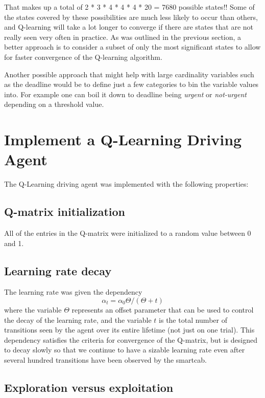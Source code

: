 \documentclass[conference]{IEEEtran}
\begin{document}
That makes up a total of 2 * 3 * 4 * 4 * 4 * 20 = 7680 possible states!!  Some
of the states covered by these possibilities are much less likely to occur than
others, and Q-learning will take a lot longer to converge if there are states
that are not really seen very often in practice.  As was outlined in the
previous section, a better approach is to consider a subset of only the most
significant states to allow for faster convergence of the Q-learning algorithm.

Another possible approach that might help with large cardinality variables such
as the deadline would be to define just a few categories to bin the variable
values into.  For example one can boil it down to deadline being
\textit{urgent} or \textit{not-urgent} depending on a threshold value. 

\section{Implement a Q-Learning Driving Agent}

The Q-Learning driving agent was implemented with the following properties:

\subsection{Q-matrix initialization}

All of the entries in the Q-matrix were initialized to a random value between
0 and 1. 

\subsection{Learning rate decay}

The learning rate was given the dependency 
\begin{equation}
    \alpha_{t} = \alpha_{0} \Theta / (\Theta + t)
\end{equation}
where the variable $\Theta$ represents an offset parameter that can be used
to control the decay of the learning rate, and the variable $t$ is the total
number of transitions seen by the agent over its entire lifetime (not just on
one trial). This dependency satisfies the criteria for convergence of the
Q-matrix, but is designed to decay slowly so that we continue to have a sizable
learning rate even after several hundred transitions have been observed by the
smartcab.

\subsection{Exploration versus exploitation}
\end{document}
